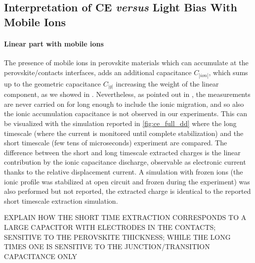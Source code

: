 	\subsection{Interpretation of CE \textsl{versus} Light Bias With Mobile Ions}

		\paragraph{Linear part with mobile ions}
		The presence of mobile ions in perovskite materials which can accumulate at the perovskite/contacts interfaces, adds an additional capacitance $C_|ion|$, which sums up to the geometric capacitance $C_|g|$ increasing the weight of the linear component, as we showed in .
		Nevertheless, as pointed out in , the  measurements are never carried on for long enough to include the ionic migration, and so also the ionic accumulation capacitance is not observed in our experiments.
		This can be visualized with the simulation reported in \cref{fig:ce_full_dd} where the long timescale (where the current is monitored until complete stabilization) and the short timescale (few tens of microseconds)  experiment are compared.
		The difference between the short and long timescale extracted charges is the linear contribution by the ionic capacitance discharge, observable as electronic current thanks to the relative displacement current.
		A simulation with frozen ions (the ionic profile was stabilized at open circuit and frozen during the  experiment) was also performed but not reported, the extracted charge is identical to the reported short timescale extraction simulation.

		EXPLAIN HOW THE SHORT TIME EXTRACTION CORRESPONDS TO A LARGE CAPACITOR WITH ELECTRODES IN THE CONTACTS; SENSITIVE TO THE PEROVSKITE THICKNESS; WHILE THE LONG TIMES ONE IS SENSITIVE TO THE JUNCTION/TRANSITION CAPACITANCE ONLY

